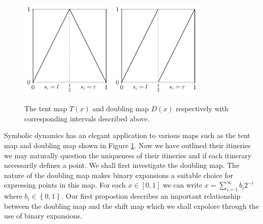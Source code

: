 \documentclass[11pt,a4paper,oneside]{memoir}
\theoremstyle{plain}
\theoremstyle{definition}
\begin{document}
\begin{figure}[h]
    \centering
    \includegraphics[width=4.5cm]{tent}
    \includegraphics[width=4.5cm]{doubling}
    \caption{The tent map $T(x)$ and doubling map $D(x)$ respectively with corresponding intervals described above.}
    \label{fig:tent-doubling}
\end{figure}

Symbolic dynamics has an elegant application to various maps such as the tent map and doubling map shown in Figure \ref{fig:tent-doubling}. Now we have outlined their itineries we may naturally question the uniqueness of their itineries and if each itinerary necessarily defines a point. We shall first investigate the doubling map. The nature of the doubling map makes binary expansions a suitable choice for expressing points in this map. For each $x \in [0, 1]$ we can write $x=\sum_{i=1}^{\infty}b_i2^{-i}$ where $b_i \in \left\lbrace 0, 1 \right\rbrace$. Our first propostion describes an important relationship between the doubling map and the shift map which we shall expolore through the use of binary expansions.
\end{document}

